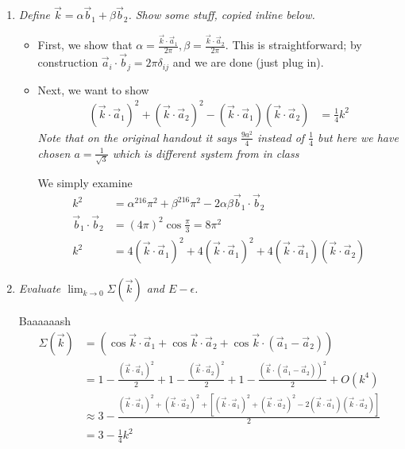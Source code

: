 \documentclass[10pt]{report}
\begin{document}
\begin{enumerate}[1.]
    \item \emph{Define $\vec{k} = \alpha \vec{b}_1 + \beta \vec{b}_2$. Show some stuff, copied inline below.}
        \begin{itemize}
            \item First, we show that $\alpha = \frac{\vec{k} \cdot \vec{a}_1}{2\pi}, \beta = \frac{\vec{k} \cdot \vec{a}_2}{2\pi}$. This is straightforward; by construction $\vec{a}_i \cdot \vec{b}_j = 2\pi\delta_{ij}$ and we are done (just plug in).
            \item Next, we want to show
                \begin{align}
                    \left( \vec{k} \cdot \vec{a}_1 \right)^2 + \left( \vec{k} \cdot \vec{a}_2 \right)^2 - (\vec{k} \cdot \vec{a}_1)(\vec{k} \cdot \vec{a}_2) &= \frac{1}{4}k^2
                \end{align}
                \emph{Note that on the original handout it says $\frac{9a^2}{4}$ instead of $\frac{1}{4}$ but here we have chosen $a=\frac{1}{\sqrt{3}}$ which is different system from in class}

                We simply examine
                \begin{align}
                    k^2 &= \alpha^216\pi^2 + \beta^216\pi^2 - 2\alpha\beta\vec{b}_1 \cdot \vec{b}_2\\
                    \vec{b}_1 \cdot \vec{b}_2 &= (4\pi)^2\cos \frac{\pi}{3} = 8\pi^2\\
                    k^2 &= 4(\vec{k} \cdot \vec{a}_1)^2 + 4(\vec{k} \cdot \vec{a}_1)^2 + 4\left( \vec{k} \cdot \vec{a}_1 \right)\left( \vec{k} \cdot \vec{a}_2 \right)
                \end{align}
        \end{itemize}
    \item \emph{Evaluate $\lim_{k \to 0}\Sigma(\vec{k})$ and $E - \epsilon$.}

        Baaaaaash
        \begin{align}
            \Sigma(\vec{k}) &= \left( \cos \vec{k} \cdot \vec{a}_1  + \cos \vec{k} \cdot \vec{a}_2 + \cos \vec{k} \cdot \left( \vec{a}_1 - \vec{a}_2 \right)\right)\\
            &= 1 - \frac{\left( \vec{k} \cdot \vec{a}_1 \right)^2}{2} + 1 - \frac{\left( \vec{k} \cdot \vec{a}_2 \right)^2}{2} + 1 - \frac{\left( \vec{k} \cdot (\vec{a}_1 - \vec{a}_2) \right)^2}{2} + O(k^4)\\
            &\approx 3 - \frac{\left( \vec{k} \cdot \vec{a}_1 \right)^2 + \left( \vec{k} \cdot \vec{a}_2 \right)^2 + \left[\left( \vec{k} \cdot \vec{a}_1 \right)^2 + \left( \vec{k} \cdot \vec{a}_2 \right)^2 - 2\left( \vec{k} \cdot \vec{a}_1 \right)\left( \vec{k} \cdot \vec{a}_2 \right)\right]}{2}\\
            &= 3 - \frac{1}{4}k^2
        \end{align}


\end{enumerate}
\end{document}
